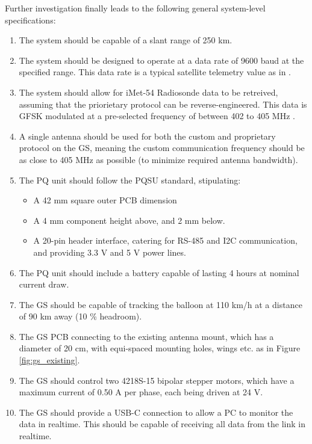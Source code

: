 Further investigation finally leads to the following general system-level specifications:
\begin{enumerate}
    \item The system should be capable of a slant range of 250 km.
    \item The system should be designed to operate at a data rate of 9600 baud at the specified range. This data rate is a typical satellite telemetry value as in \cite{paper-deployableAntenna}.
    \item The system should allow for iMet-54 Radiosonde data to be retreived, assuming that the priorietary protocol can be reverse-engineered. This data is GFSK modulated at a pre-selected frequency of between 402 to 405 MHz \cite{datasheet-iMet54}.
    \item A single antenna should be used for both the custom and proprietary protocol on the GS, meaning the custom communication frequency should be as close to 405 MHz as possible (to minimize required antenna bandwidth).
    \item The PQ unit should follow the PQSU standard, stipulating:
    \begin{itemize}
        \item A 42 mm square outer PCB dimension
        \item A 4 mm component height above, and 2 mm below.
        \item A 20-pin header interface, catering for RS-485 and I2C communication, and providing 3.3 V and 5 V power lines.
    \end{itemize}
    \item The PQ unit should include a battery capable of lasting 4 hours at nominal current draw.
    \item The GS should be capable of tracking the balloon at 110 km/h at a distance of 90 km away (10 \% headroom).
    \item The GS PCB connecting to the existing antenna mount, which has a diameter of 20 cm, with equi-spaced mounting holes, wings etc. as in Figure \ref{fig:gs_existing}.
    \item The GS should control two 4218S-15 bipolar stepper motors, which have a maximum current of 0.50 A per phase, each being driven at 24 V.
    \item The GS should provide a USB-C connection to allow a PC to monitor the data in realtime. This should be capable of receiving all data from the link in realtime.
\end{enumerate}